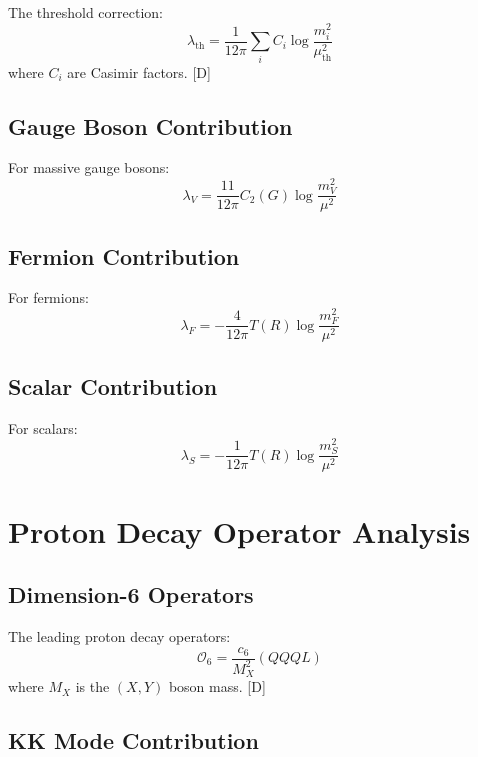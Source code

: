 \documentclass[11pt,a4paper]{article}
\begin{document}
The threshold correction:
\begin{equation}
\lambda_{\text{th}} = \frac{1}{12\pi}\sum_i C_i \log\frac{m_i^2}{\mu_{\text{th}}^2}
\label{eq:threshold-lambda}
\end{equation}
where $C_i$ are Casimir factors. [D]

\subsection{Gauge Boson Contribution}

For massive gauge bosons:
\begin{equation}
\lambda_V = \frac{11}{12\pi}C_2(G)\log\frac{m_V^2}{\mu^2}
\label{eq:gauge-threshold}
\end{equation}

\subsection{Fermion Contribution}

For fermions:
\begin{equation}
\lambda_F = -\frac{4}{12\pi}T(R)\log\frac{m_F^2}{\mu^2}
\label{eq:fermion-threshold}
\end{equation}

\subsection{Scalar Contribution}

For scalars:
\begin{equation}
\lambda_S = -\frac{1}{12\pi}T(R)\log\frac{m_S^2}{\mu^2}
\label{eq:scalar-threshold}
\end{equation}

\section{Proton Decay Operator Analysis}
\label{app:proton}

\subsection{Dimension-6 Operators}

The leading proton decay operators:
\begin{equation}
\mathcal{O}_6 = \frac{c_6}{M_X^2}(QQQL)
\label{eq:dim6-op}
\end{equation}
where $M_X$ is the $(X,Y)$ boson mass. [D]

\subsection{KK Mode Contribution}
\end{document}
